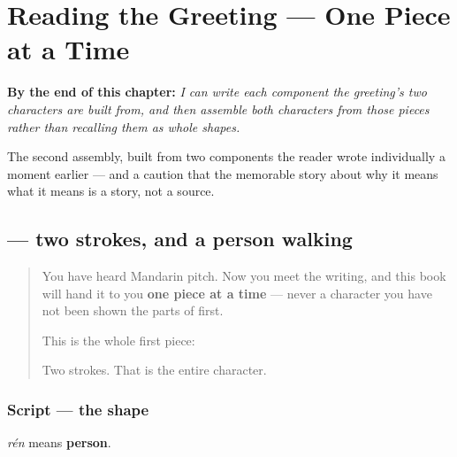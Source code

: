 
\chapter{Reading the Greeting — One Piece at a Time}
\label{ch:zh-components}

\begin{chapteropening}
\textbf{By the end of this chapter:} \emph{I can write each component the greeting's two characters are built from, and then assemble both characters from those pieces rather than recalling them as whole shapes.}

The second assembly, built from two components the reader wrote individually a moment earlier — and a caution that the memorable story about why it means what it means is a story, not a source.
\end{chapteropening}

\section[\texorpdfstring{\zh{人} (rén)}{人 (rén)}]{ — two strokes, and a person walking}

\label{lesson:ZH-W01-ren}



\begin{quote}
You have heard Mandarin pitch. Now you meet the writing, and this book will hand it to you \textbf{one piece at a time} — never a character you have not been shown the parts of first.

This is the whole first piece:

\begin{quote}
\end{quote}

Two strokes. That is the entire character.
\end{quote}

\subsection*{Script — the shape}

\textbf{} \emph{rén} means \textbf{person}.

